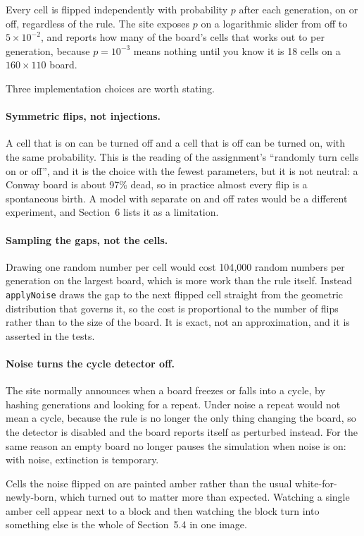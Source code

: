 \documentclass[11pt]{article}
\begin{document}
Every cell is flipped independently with probability $p$ after each generation, on or off, regardless
of the rule. The site exposes $p$ on a logarithmic slider from off to $5\times10^{-2}$, and reports
how many of the board's cells that works out to per generation, because $p=10^{-3}$ means nothing
until you know it is 18 cells on a $160\times110$ board.

Three implementation choices are worth stating.

\paragraph{Symmetric flips, not injections.} A cell that is on can be turned off and a cell that is
off can be turned on, with the same probability. This is the reading of the assignment's ``randomly
turn cells on or off'', and it is the choice with the fewest parameters, but it is not neutral: a
Conway board is about 97\% dead, so in practice almost every flip is a spontaneous birth. A model
with separate on and off rates would be a different experiment, and Section~6 lists it as a
limitation.

\paragraph{Sampling the gaps, not the cells.} Drawing one random number per cell would cost 104{,}000
random numbers per generation on the largest board, which is more work than the rule itself. Instead
\texttt{applyNoise} draws the gap to the next flipped cell straight from the geometric distribution
that governs it, so the cost is proportional to the number of flips rather than to the size of the
board. It is exact, not an approximation, and it is asserted in the tests.

\paragraph{Noise turns the cycle detector off.} The site normally announces when a board freezes or
falls into a cycle, by hashing generations and looking for a repeat. Under noise a repeat would not
mean a cycle, because the rule is no longer the only thing changing the board, so the detector is
disabled and the board reports itself as perturbed instead. For the same reason an empty board no
longer pauses the simulation when noise is on: with noise, extinction is temporary.

Cells the noise flipped on are painted amber rather than the usual white-for-newly-born, which turned
out to matter more than expected. Watching a single amber cell appear next to a block and then
watching the block turn into something else is the whole of Section~5.4 in one image.
\end{document}
